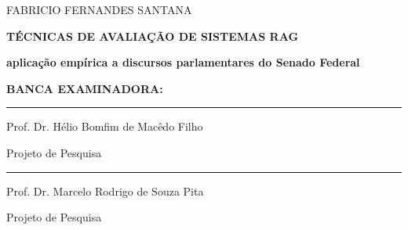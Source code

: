\documentclass[12pt,a4paper]{article}
\newcommand{\discente}{Fabricio Fernandes Santana}
\newcommand{\titulo}{Técnicas de avaliação de sistemas RAG}
\newcommand{\subtitulo}{aplicação empírica a discursos parlamentares do Senado Federal}
\begin{document}
\begin{titlepage}
\begin{center}
\MakeUppercase{\discente}\par

\vspace{3cm}

{\bfseries\MakeUppercase{\titulo}}\par
\vspace{0.5cm}
{\bfseries\subtitulo}\par

\vspace{3cm}

\textbf{BANCA EXAMINADORA:}\par
\end{center}

\vspace{1.5cm}

\noindent\rule{\textwidth}{0.4pt}\par
Prof. Dr. Hélio Bomfim de Macêdo Filho\par
Projeto de Pesquisa

\vspace{1cm}

\noindent\rule{\textwidth}{0.4pt}\par
Prof. Dr. Marcelo Rodrigo de Souza Pita\par
Projeto de Pesquisa
\end{titlepage}

\tableofcontents
\clearpage
\hypersetup{pageanchor=true}







\end{document}
